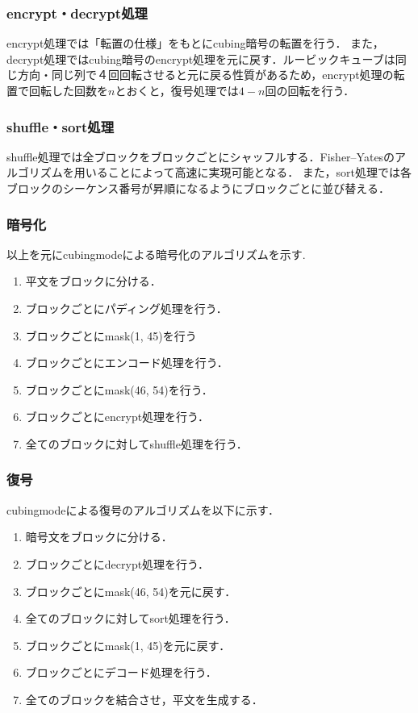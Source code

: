 \documentclass[a4j,titlepage]{jsarticle}
\begin{document}
\subsubsection{encrypt・decrypt処理}
encrypt処理では「転置の仕様」をもとにcubing暗号の転置を行う．
また，decrypt処理ではcubing暗号のencrypt処理を元に戻す．ルービックキューブは同じ方向・同じ列で４回回転させると元に戻る性質があるため，encrypt処理の転置で回転した回数を\(n\)とおくと，復号処理では\(4-n\)回の回転を行う．

\subsubsection{shuffle・sort処理}
shuffle処理では全ブロックをブロックごとにシャッフルする．Fisher–Yatesのアルゴリズムを用いることによって高速に実現可能となる．
また，sort処理では各ブロックのシーケンス番号が昇順になるようにブロックごとに並び替える．

\subsubsection{暗号化}
以上を元にcubingmodeによる暗号化のアルゴリズムを示す. 
\begin{screen}
  \begin{enumerate}
    \item 平文をブロックに分ける．
    \item ブロックごとにパディング処理を行う．
    \item ブロックごとにmask(\phantom{0}1, 45)を行う
    \item ブロックごとにエンコード処理を行う．
    \item ブロックごとにmask(46, 54)を行う．
    \item ブロックごとにencrypt処理を行う．
    \item 全てのブロックに対してshuffle処理を行う．
  \end{enumerate}
\end{screen}

\subsubsection{復号}
cubingmodeによる復号のアルゴリズムを以下に示す．
\begin{screen}
  \begin{enumerate}
    \item 暗号文をブロックに分ける．
    \item ブロックごとにdecrypt処理を行う．
    \item ブロックごとにmask(46, 54)を元に戻す．
    \item 全てのブロックに対してsort処理を行う．
    \item ブロックごとにmask(\phantom{0}1, 45)を元に戻す．
    \item ブロックごとにデコード処理を行う．
    \item 全てのブロックを結合させ，平文を生成する．
  \end{enumerate}
\end{screen}
\end{document}
